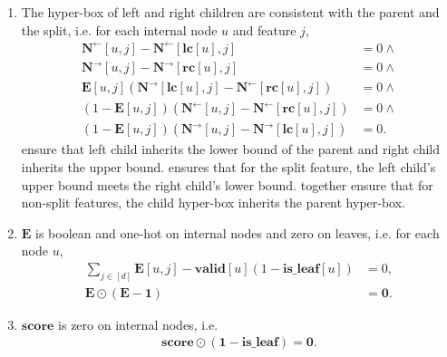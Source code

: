 \begin{enumerate}
  \item The hyper-box of left and right children are consistent with the parent and the split, i.e. for each internal node $u$ and feature $j$,
    \begin{align}
    \mathbf{N}^{\leftarrow}[u, j] - \mathbf{N}^{\leftarrow}[\mathbf{lc}[u], j] &= 0\land\label{eq:left-child-inherits-lowerbound}\\
    \mathbf{N}^{\rightarrow}[u, j] - \mathbf{N}^{\rightarrow}[\mathbf{rc}[u], j] &= 0\land\label{eq:right-child-inherits-upperbound}\\
    \mathbf{E}[u, j](\mathbf{N}^{\rightarrow}[\mathbf{lc}[u], j] - \mathbf{N}^{\leftarrow}[\mathbf{rc}[u], j]) &= 0\land\label{eq:split-child-consistency}\\
    (1-\mathbf{E}[u, j])(\mathbf{N}^{\leftarrow}[u, j] - \mathbf{N}^{\leftarrow}[\mathbf{rc}[u], j]) &= 0\land\label{eq:non-split-child-inherits-1}\\
    (1-\mathbf{E}[u, j])(\mathbf{N}^{\rightarrow}[u, j] - \mathbf{N}^{\rightarrow}[\mathbf{lc}[u], j]) &= 0.\label{eq:non-split-child-inherits-2}
    \end{align}
     ensure that 
    left child inherits the lower bound of the parent and right child inherits the upper bound.
     ensures that for the split feature, 
    the left child's upper bound meets the right child's lower bound.
     together ensure that 
    for non-split features, the child hyper-box inherits the parent hyper-box.

  \item $\mathbf{E}$ is boolean and one-hot on internal nodes and zero on leaves, i.e. for each node $u$,
    \begin{align}
    \sum_{j\in[d]} \mathbf{E}[u, j] - \mathbf{valid}[u](1-\mathbf{is\_leaf}[u]) &= 0,\\
    \mathbf{E}\odot(\mathbf{E}-\mathbf{1}) &= \mathbf{0}.
    \end{align}

  \item $\mathbf{score}$ is zero on internal nodes, i.e.
    \begin{align}
    \mathbf{score}\odot (\mathbf{1}-\mathbf{is\_leaf}) = \mathbf{0}.
    \end{align}
  \end{enumerate}

